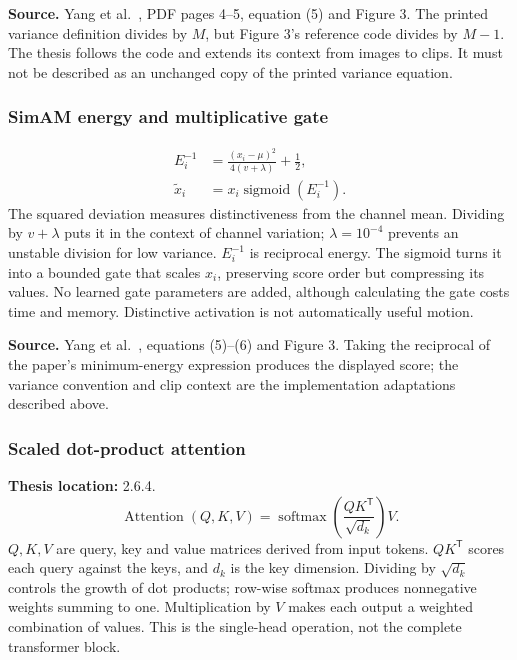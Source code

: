 \documentclass[11pt,a4paper]{article}
\numberwithin{equation}{section}
\begin{document}
\textbf{Source.} Yang et al.~\cite{yang2021}, PDF pages 4--5,
equation (5) and Figure 3. The printed variance definition divides by $M$,
but Figure 3's reference code divides by $M-1$. The thesis follows the code
and extends its context from images to clips. It must not be described as
an unchanged copy of the printed variance equation.

\subsubsection{SimAM energy and multiplicative gate}
\label{fg:simamgate}
\begin{equation}
\begin{aligned}
    E_i^{-1}&=\frac{(x_i-\mu)^2}{4(v+\lambda)}+\frac12,\\
    \widetilde x_i&=x_i\operatorname{sigmoid}(E_i^{-1}).
\end{aligned}
    \label{fg:eq:simamgate}
\end{equation}
The squared deviation measures distinctiveness from the channel mean.
Dividing by $v+\lambda$ puts it in the context of channel variation;
$\lambda=10^{-4}$ prevents an unstable division for low variance.
$E_i^{-1}$ is reciprocal energy. The sigmoid turns it into a bounded gate
that scales $x_i$, preserving score order but compressing its values.
No learned gate parameters are added, although calculating the gate costs
time and memory. Distinctive activation is not automatically useful motion.

\textbf{Source.} Yang et al.~\cite{yang2021}, equations (5)--(6) and
Figure 3. Taking the reciprocal of the paper's minimum-energy expression
produces the displayed score; the variance convention and clip context are
the implementation adaptations described above.

\subsubsection{Scaled dot-product attention}
\label{fg:attention}
\textbf{Thesis location:} 2.6.4.
\begin{equation}
    \operatorname{Attention}(Q,K,V)
      =\operatorname{softmax}\left(\frac{QK^{\mathsf T}}{\sqrt{d_k}}\right)V.
    \label{fg:eq:attention}
\end{equation}
$Q,K,V$ are query, key and value matrices derived from input tokens.
$QK^{\mathsf T}$ scores each query against the keys, and $d_k$ is the key
dimension. Dividing by $\sqrt{d_k}$ controls the growth of dot products;
row-wise softmax produces nonnegative weights summing to one. Multiplication
by $V$ makes each output a weighted combination of values. This is the
single-head operation, not the complete transformer block.
\end{document}

